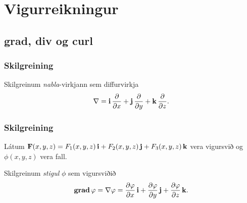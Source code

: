 
\theoremstyle{definition}
\newtheorem{exercise}[theorem]{}





\newbox\mytempbox
\newdimen\mytempdimen

\newcommand\includegraphicscopyright[3][]{%
  \leavevmode\vbox{\vskip3pt\raggedright\setbox\mytempbox=\hbox{\texttt{[image: \#2]}}%
    \mytempdimen=\wd\mytempbox\box\mytempbox\par\vskip1pt%
    \fontsize{3}{3.5}\selectfont{\color{black!25}{\vbox{\hsize=\mytempdimen#3}}}\vskip3pt%
}}

\newenvironment{colortabular}[1]{\medskip\rowcolors[]{1}{blue!20}{blue!10}\tabular{#1}\rowcolor{blue!40}}{\endtabular\medskip}

\def\equad{\leavevmode\hbox{}\quad}

\newenvironment{greencolortabular}[1]
{\medskip\rowcolors[]{1}{green!50!black!20}{green!50!black!10}%
  \tabular{#1}\rowcolor{green!50!black!40}}%
{\endtabular\medskip}





\section{Vigurreikningur}

\subsection{grad, div og curl} 

\subsubsection{Skilgreining \rtask{}}
 Skilgreinum {\em nabla}-virkjann sem diffurvirkja
$$\nabla=\mbox{${\bf i}$}\,\frac{\partial}{\partial x}+\mbox{${\bf j}$}\,\frac{\partial}{\partial y}+\mbox{${\bf k}$}\,\frac{\partial}{\partial z}.$$



\subsubsection{Skilgreining \rtask{}}
 Látum
$\mbox{${\bf F}$}(x,y,z)=F_1(x,y,z)\,\mbox{${\bf i}$}+F_2(x,y,z)\,\mbox{${\bf j}$}+F_3(x,y,z)\,\mbox{${\bf k}$}$ vera
vigursvið og $\phi(x,y,z)$ vera fall. 

Skilgreinum  {\em stigul} $\phi$ sem vigursviðið 
$$\mbox{${\rm\bf grad\,}$} \varphi=\nabla\varphi=\frac{\partial \varphi}{\partial x}\,\mbox{${\bf i}$}+
\frac{\partial \varphi}{\partial y}\,\mbox{${\bf j}$}+\frac{\partial \varphi}{\partial z}\,\mbox{${\bf k}$}.$$

